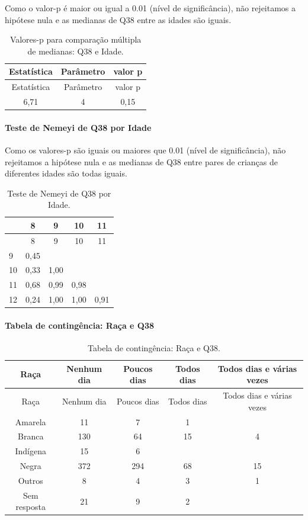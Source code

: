 \documentclass[]{article}
\let\oldparagraph\paragraph
\renewcommand{\paragraph}[1]{\oldparagraph{#1}\mbox{}}
\begin{document}
Como o valor-p é maior ou igual a 0.01 (nível de significância), não rejeitamos a hipótese nula e as medianas de Q38 entre as idades são iguais.

\begin{longtable}[]{@{}ccc@{}}
\caption{\label{tab:unnamed-chunk-1456}Valores-p para comparação múltipla de medianas: Q38 e Idade.}\tabularnewline
\toprule
Estatística & Parâmetro & valor p\tabularnewline
\midrule
\endfirsthead
\toprule
Estatística & Parâmetro & valor p\tabularnewline
\midrule
\endhead
6,71 & 4 & 0,15\tabularnewline
\bottomrule
\end{longtable}

\hypertarget{teste-de-nemeyi-de-q38-por-idade}{%
\paragraph{Teste de Nemeyi de Q38 por Idade}\label{teste-de-nemeyi-de-q38-por-idade}}

Como os valores-p são iguais ou maiores que 0.01 (nível de significância), não rejeitamos a hipótese nula e as medianas de Q38 entre pares de crianças de diferentes idades são todas iguais.

\begin{longtable}[]{@{}lcccc@{}}
\caption{\label{tab:unnamed-chunk-1458}Teste de Nemeyi de Q38 por Idade.}\tabularnewline
\toprule
& 8 & 9 & 10 & 11\tabularnewline
\midrule
\endfirsthead
\toprule
& 8 & 9 & 10 & 11\tabularnewline
\midrule
\endhead
9 & 0,45 & & &\tabularnewline
10 & 0,33 & 1,00 & &\tabularnewline
11 & 0,68 & 0,99 & 0,98 &\tabularnewline
12 & 0,24 & 1,00 & 1,00 & 0,91\tabularnewline
\bottomrule
\end{longtable}

\cleardoublepage

\hypertarget{tabela-de-continguxeancia-rauxe7a-e-q38}{%
\paragraph{Tabela de contingência: Raça e Q38}\label{tabela-de-continguxeancia-rauxe7a-e-q38}}

\begin{longtable}[]{@{}ccccc@{}}
\caption{\label{tab:unnamed-chunk-1459}Tabela de contingência: Raça e Q38.}\tabularnewline
\toprule
Raça & Nenhum dia & Poucos dias & Todos dias & Todos dias e várias vezes\tabularnewline
\midrule
\endfirsthead
\toprule
Raça & Nenhum dia & Poucos dias & Todos dias & Todos dias e várias vezes\tabularnewline
\midrule
\endhead
Amarela & 11 & 7 & 1 &\tabularnewline
Branca & 130 & 64 & 15 & 4\tabularnewline
Indígena & 15 & 6 & &\tabularnewline
Negra & 372 & 294 & 68 & 15\tabularnewline
Outros & 8 & 4 & 3 & 1\tabularnewline
Sem resposta & 21 & 9 & 2 &\tabularnewline
\bottomrule
\end{longtable}
\end{document}
